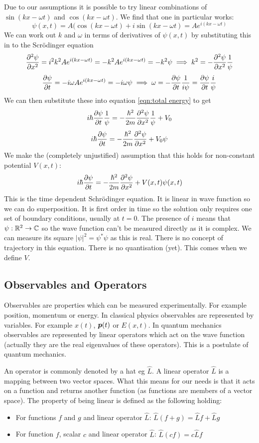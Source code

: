 \documentclass{article}
\begin{document}
    Due to our assumptions it is possible to try linear combinations of \(\sin(kx - \omega t)\) and \(\cos(kx - \omega t)\). 
    We find that one in particular works:
    \[\psi(x, t) = A(\cos(kx - \omega t) + i\sin(kx - \omega t) = Ae^{i(kx - \omega t)}\]
    We can work out \(k\) and \(\omega\) in terms of derivatives of \(\psi(x, t)\) by substituting this in to the Scr\"odinger equation
    \[\pdv[2]{\psi}{x} = i^2k^2Ae^{i(kx - \omega t)} = -k^2Ae^{i(kx - \omega t)} = -k^2\psi\implies k^2 = -\pdv[2]{\psi}{x}\frac{1}{\psi}\]
    \[\pdv{\psi}{t} = -i\omega Ae^{i(kx-\omega t)} = -i\omega\psi \implies \omega = -\pdv{\psi}{t}\frac{1}{i\psi} = \pdv{\psi}{t}\frac{i}{\psi}\]
    We can then substitute these into equation \ref{eqn:total energy} to get
    \[i\hbar\pdv{\psi}{t}\frac{1}{\psi} = -\frac{\hbar^2}{2m}\pdv[2]{\psi}{x}\frac{1}{\psi} + V_0\]
    \[i\hbar\pdv{\psi}{t} = -\frac{\hbar^2}{2m}\pdv[2]{\psi}{x} + V_0\psi\]
    We make the (completely unjustified) assumption that this holds for non-constant potential \(V(x, t)\):
    \[i\hbar\pdv{\psi}{t} = -\frac{\hbar^2}{2m}\pdv[2]{\psi}{x} + V(x, t)\psi(x, t)\]
    This is the time dependent Schr\"odinger equation.
    It is linear in wave function so we can do superposition.
    It is first order in time so the solution only requires one set of boundary conditions, usually at \(t = 0\).
    The presence of \(i\) means that \(\psi:\mathbb{R}^2\to \mathbb{C}\) so the wave function can't be measured directly as it is complex.
    We can measure its square \(|\psi|^2 = \psi^*\psi\) as this is real.
    There is no concept of trajectory in this equation.
    There is no quantisation (yet).
    This comes when we define \(V\).
    
    \subsection{Observables and Operators}
    Observables are properties which can be measured experimentally.
    For example position, momentum or energy.
    In classical physics observables are represented by variables. For example \(x(t)\), \(\bm{p}(t)\) or \(E(x, t)\).
    In quantum mechanics observables are represented by linear operators which act on the wave function (actually they are the real eigenvalues of these operators).
    This is a postulate of quantum mechanics.
    
    An operator is commonly denoted by a hat eg \(\hat L\).
    A linear operator \(\hat L\) is a mapping between two vector spaces.
    What this means for our needs is that it acts on a function and returns another function (as functions are members of a vector space).
    The property of being linear is defined as the following holding:
    \begin{itemize}
        \item For functions \(f\) and \(g\) and linear operator \(\hat L\): \(\hat L(f + g) = \hat Lf + \hat Lg\)
        \item For function \(f\), scalar \(c\) and linear operator \(\hat L\): \(\hat L(cf) = c\hat Lf\)
    \end{itemize}
    
\end{document}
